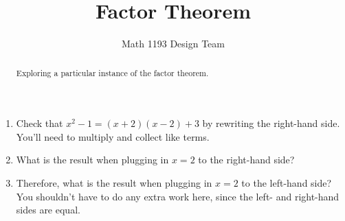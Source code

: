 \documentclass[noauthor]{ximera}
\title{Factor Theorem}
\author{Math 1193 Design Team}
\begin{document}
\begin{abstract}
    Exploring a particular instance of the factor theorem.
\end{abstract}
\maketitle

\begin{enumerate}
    \item Check that \(x^2 - 1 = (x + 2)(x - 2) + 3\) by rewriting the right-hand
    side. You'll need to multiply and collect like terms.
    \item What is the result when plugging in \(x = 2\) to the right-hand side?
    \item Therefore, what is the result when plugging in \(x = 2\) to the left-hand
    side? You shouldn't have to do any extra work here, since the
    left- and right-hand sides are equal.
\end{enumerate}
\end{document}
